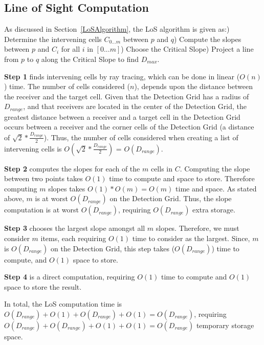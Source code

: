 \subsection{Line of Sight Computation}
\label{bigOLoS}
As discussed in Section~\ref{LoSAlgorithm}, the LoS algorithm is given as:) Determine the intervening cells $C_{0...m}$ between $p$ and $q$) Compute the slopes between $p$ and $C_i$ for all $i$ in $[0 ... m]$) Choose the Critical Slope) Project a line from $p$ to $q$ along the Critical Slope to find $D_{max}$.\newline

\textbf{Step 1} finds intervening cells by ray tracing, which can be done in linear ($O(n)$) time.  The number of cells considered ($n$), depends upon the distance between the receiver and the target cell\cite{rayTracing}.  Given that the Detection Grid has a radius of $D_{range}$, and that receivers are located in the center of the Detection Grid, the greatest distance between a receiver and a target cell in the Detection Grid occurs between a receiver and the corner cells of the Detection Grid (a distance of $\sqrt2*\frac{D_{range}}{2}$).  Thus, the number of cells considered when creating a list of intervening cells is $O(\sqrt2*\frac{D_{range}}{2})$ = $O(D_{range})$.

\textbf{Step 2} computes the slopes for each of the $m$ cells in $C$.  Computing the slope between two points takes $O(1)$ time to compute and space to store.  Therefore computing $m$ slopes takes $O(1)*O(m)=O(m)$ time and space.  As stated above, $m$ is at worst $O(D_{range})$ on the Detection Grid.  Thus, the slope computation is at worst $O(D_{range})$, requiring $O(D_{range})$ extra storage.

\textbf{Step 3} chooses the largest slope amongst all $m$ slopes.  Therefore, we must consider $m$ items, each requiring $O(1)$ time to consider as the largest.  Since, $m$ is $O(D_{range})$ on the Detection Grid, this step takes ($O(D_{range})$) time to compute, and $O(1)$ space to store.  

\textbf{Step 4} is a direct computation, requiring $O(1)$ time to compute and $O(1)$ space to store the result.

In total, the LoS computation time is $O(D_{range}) + O(1) + O(D_{range}) + O(1) = O(D_{range})$, requiring $O(D_{range}) + O(D_{range}) + O(1) + O(1) = O(D_{range})$ temporary storage space.

